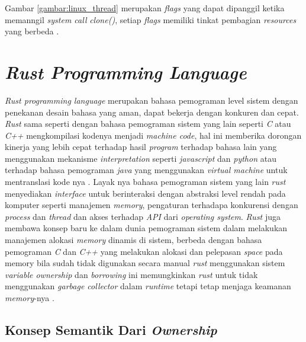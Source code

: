 Gambar \ref{gambar:linux_thread} merupakan \emph{flags} yang dapat dipanggil ketika memanngil \emph{system call} \emph{clone()}, setiap \emph{flags} memiliki tinkat pembagian \emph{resources} yang berbeda \citep{operatingsystemconcept}.

\section{\emph{Rust Programming Language}}

\emph{Rust programming language} merupakan bahasa pemograman level sistem dengan penekanan desain bahasa yang aman, dapat bekerja dengan konkuren dan cepat. \emph{Rust} sama seperti dengan bahasa pemograman sistem yang lain seperti \emph{C} atau \emph{C++} mengkompilasi kodenya menjadi \emph{machine code}, hal ini memberika dorongan kinerja yang lebih cepat terhadap hasil \emph{program} terhadap bahasa lain yang menggunakan mekanisme \emph{interpretation} seperti \emph{javascript} dan \emph{python} atau terhadap bahasa pemograman \emph{java} yang menggunakan \emph{virtual machine} untuk mentranslasi kode nya \citep{rustbook}. Layak nya bahasa pemograman sistem yang lain \emph{rust} menyediakan \emph{interface} untuk berinteraksi dengan abstraksi level rendah pada komputer seperti manajemen \emph{memory}, pengaturan terhadapa konkurensi dengan \emph{process} dan \emph{thread} dan akses terhadap \emph{API} dari \emph{operating system}. \emph{Rust} juga membawa konsep baru ke dalam dunia pemograman sistem dalam melakukan manajemen alokasi \emph{memory} dinamis di sistem, berbeda dengan bahasa pemograman \emph{C} dan \emph{C++} yang melakukan alokasi dan pelepasan \emph{space} pada memory bila sudah tidak digunakan secara manual \emph{rust} menggunakan sistem \emph{variable ownership} dan \emph{borrowing} ini memungkinkan \emph{rust} untuk tidak menggunakan \emph{garbage collector} dalam \emph{runtime} tetapi tetap menjaga keamanan \emph{memory}-nya \citep{rustbook}.

\subsection{Konsep Semantik Dari \emph{Ownership}}


